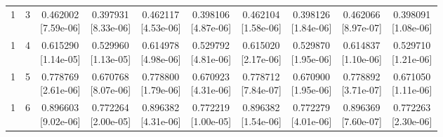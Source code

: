 \documentclass[12pt,letterpaper]{article}
\theoremstyle{plain}
\theoremstyle{definition}
\begin{document}
\begin{table}[p]
\begin{adjustbox}{max width=\linewidth}
\begin{tabular}{@{}rr*{8}{c}@{}}
1 & 3 & \shortstack{0.462002\\[-1pt]{\scriptsize[7.59e-06]}} & \shortstack{0.397931\\[-1pt]{\scriptsize[8.33e-06]}} & \shortstack{0.462117\\[-1pt]{\scriptsize[4.53e-06]}} & \shortstack{0.398106\\[-1pt]{\scriptsize[4.87e-06]}} & \shortstack{0.462104\\[-1pt]{\scriptsize[1.58e-06]}} & \shortstack{0.398126\\[-1pt]{\scriptsize[1.84e-06]}} & \shortstack{0.462066\\[-1pt]{\scriptsize[8.97e-07]}} & \shortstack{0.398091\\[-1pt]{\scriptsize[1.08e-06]}}\\
1 & 4 & \shortstack{0.615290\\[-1pt]{\scriptsize[1.14e-05]}} & \shortstack{0.529960\\[-1pt]{\scriptsize[1.13e-05]}} & \shortstack{0.614978\\[-1pt]{\scriptsize[4.98e-06]}} & \shortstack{0.529792\\[-1pt]{\scriptsize[4.81e-06]}} & \shortstack{0.615020\\[-1pt]{\scriptsize[2.17e-06]}} & \shortstack{0.529870\\[-1pt]{\scriptsize[1.95e-06]}} & \shortstack{0.614837\\[-1pt]{\scriptsize[1.10e-06]}} & \shortstack{0.529710\\[-1pt]{\scriptsize[1.21e-06]}}\\
1 & 5 & \shortstack{0.778769\\[-1pt]{\scriptsize[2.61e-06]}} & \shortstack{0.670768\\[-1pt]{\scriptsize[8.07e-06]}} & \shortstack{0.778800\\[-1pt]{\scriptsize[1.79e-06]}} & \shortstack{0.670923\\[-1pt]{\scriptsize[4.31e-06]}} & \shortstack{0.778712\\[-1pt]{\scriptsize[7.84e-07]}} & \shortstack{0.670900\\[-1pt]{\scriptsize[1.95e-06]}} & \shortstack{0.778892\\[-1pt]{\scriptsize[3.71e-07]}} & \shortstack{0.671050\\[-1pt]{\scriptsize[1.11e-06]}}\\
1 & 6 & \shortstack{0.896603\\[-1pt]{\scriptsize[9.02e-06]}} & \shortstack{0.772264\\[-1pt]{\scriptsize[2.00e-05]}} & \shortstack{0.896382\\[-1pt]{\scriptsize[4.31e-06]}} & \shortstack{0.772219\\[-1pt]{\scriptsize[1.00e-05]}} & \shortstack{0.896382\\[-1pt]{\scriptsize[1.54e-06]}} & \shortstack{0.772279\\[-1pt]{\scriptsize[4.01e-06]}} & \shortstack{0.896369\\[-1pt]{\scriptsize[7.60e-07]}} & \shortstack{0.772263\\[-1pt]{\scriptsize[2.30e-06]}}\\

\end{tabular}
\end{adjustbox}
\end{table}
\end{document}
